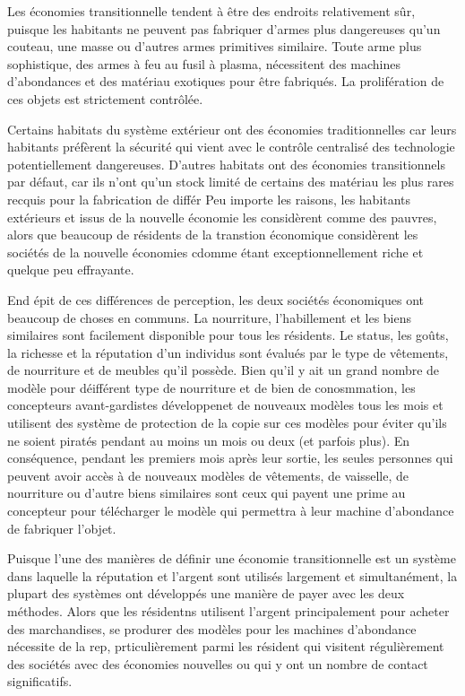 Les économies transitionnelle tendent à être des endroits relativement sûr, puisque les habitants ne peuvent pas fabriquer d'armes plus dangereuses qu'un couteau, une masse ou d'autres armes primitives similaire. Toute arme plus sophistique, des armes à feu au fusil à plasma, nécessitent des machines d'abondances et des matériau exotiques pour être fabriqués. La prolifération de ces objets est strictement contrôlée. 

Certains habitats du système extérieur ont des économies traditionnelles car leurs habitants préfèrent la sécurité qui vient avec le contrôle centralisé des technologie potentiellement dangereuses. D'autres habitats ont des économies transitionnels par défaut, car ils n'ont qu'un stock limité de certains des matériau les plus rares recquis pour la fabrication de différ Peu importe les raisons, les habitants extérieurs et issus de la nouvelle économie les considèrent comme des pauvres, alors que beaucoup de résidents de la transtion économique considèrent les sociétés de la nouvelle économies cdomme étant exceptionnellement riche et quelque peu effrayante. 

End épit de ces différences de perception, les deux sociétés économiques ont beaucoup de choses en communs. La nourriture, l'habillement et les biens similaires sont facilement disponible pour tous les résidents. Le status, les goûts, la richesse et la réputation d'un individus sont évalués par le type de vêtements, de nourriture et de meubles qu'il possède. Bien qu'il y ait un grand nombre de modèle pour déifférent type de nourriture et de bien de conosmmation, les concepteurs avant-gardistes développenet de nouveaux modèles tous les mois et utilisent des système de protection de la copie sur ces modèles pour éviter qu'ils ne soient piratés pendant au moins un mois ou deux (et parfois plus). En conséquence, pendant les premiers mois après leur sortie, les seules personnes qui peuvent avoir accès à de nouveaux modèles de vêtements, de vaisselle, de nourriture ou d'autre biens similaires sont ceux qui payent une prime au concepteur pour télécharger le modèle qui permettra à leur machine d'abondance de fabriquer l'objet. 

Puisque l'une des manières de définir une économie transitionnelle est un système dans laquelle la réputation et l'argent sont utilisés largement et simultanément, la plupart des systèmes ont développés une manière de payer avec les deux méthodes. Alors que les résidentns utilisent l'argent principalement pour acheter des marchandises, se produrer des modèles pour les machines d'abondance nécessite de la rep, prticulièrement parmi les résident qui visitent régulièrement des sociétés avec des économies nouvelles ou qui y ont un nombre de contact significatifs. 

